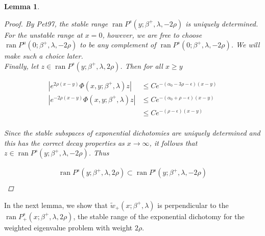 \documentclass[12pt]{article}
\DeclareMathOperator{\ran}{ran}
\newtheorem{lemma}{Lemma}
\begin{document}
\begin{lemma}
\begin{proof}
By Pet97, the stable range $\ran P^s(y; \beta^+, \lambda, -2 \rho)$ is uniquely determined. For the unstable range at $x = 0$, however, we are free to choose $\ran P^u(0; \beta^+, \lambda, -2 \rho)$ to be any complement of $\ran P^s(0; \beta^+, \lambda, -2 \rho)$. We will make such a choice later.\\

Finally, let $z \in \ran P^s(y; \beta^+, \lambda, 2 \rho)$. Then for all $x \geq y$

\begin{align*}
|e^{2 \rho (x - y)} \Phi(x, y; \beta^+, \lambda)z| &\leq C e^{-(\alpha_0 - 3 \rho - \epsilon)(x - y)} \\
|e^{-2 \rho (x - y)} \Phi(x, y; \beta^+, \lambda)z| &\leq C e^{-(\alpha_0 + \rho - \epsilon)(x - y)} \\
&\leq C e^{-(\rho - \epsilon)(x - y)} \\
\end{align*}

Since the stable subspaces of exponential dichotomies are uniquely determined and this has the correct decay properties as $x \rightarrow \infty$, it follows that $z \in \ran P^s(y; \beta^+, \lambda, -2 \rho)$. Thus

\begin{align*}
\ran P^s(y; \beta^+, \lambda, 2 \rho) \subset \ran P^s(y; \beta^+, \lambda, -2 \rho) \\
\end{align*}

\end{proof}
\end{lemma}

In the next lemma, we show that $\tilde{w}_+(x; \beta^+, \lambda)$ is perpendicular to the $\ran P^s_+(x; \beta^+, \lambda, 2 \rho)$, the stable range of the exponential dichotomy for the weighted eigenvalue problem with weight $2 \rho$.

\end{document}
